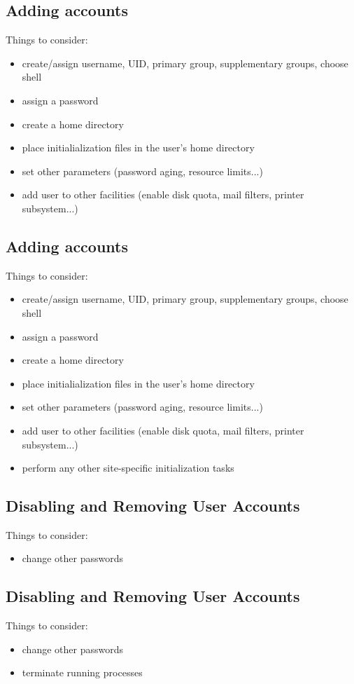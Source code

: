 \documentclass[xga]{xdvislides}
\begin{document}
\subsection{Adding accounts}
Things to consider:
\begin{itemize}
	\item create/assign username, UID, primary group, supplementary groups,
		choose shell
	\item assign a password
	\item create a home directory
	\item place initialialization files in the user's home directory
	\item set other parameters (password aging, resource limits...)
	\item add user to other facilities (enable disk quota, mail filters,
		printer subsystem...)
\end{itemize}

\subsection{Adding accounts}
Things to consider:
\begin{itemize}
	\item create/assign username, UID, primary group, supplementary groups,
		choose shell
	\item assign a password
	\item create a home directory
	\item place initialialization files in the user's home directory
	\item set other parameters (password aging, resource limits...)
	\item add user to other facilities (enable disk quota, mail filters,
		printer subsystem...)
	\item perform any other site-specific initialization tasks
\end{itemize}

\subsection{Disabling and Removing User Accounts}
Things to consider:
\begin{itemize}
	\item change other passwords
\end{itemize}

\subsection{Disabling and Removing User Accounts}
Things to consider:
\begin{itemize}
	\item change other passwords
	\item terminate running processes
\end{itemize}
\end{document}
